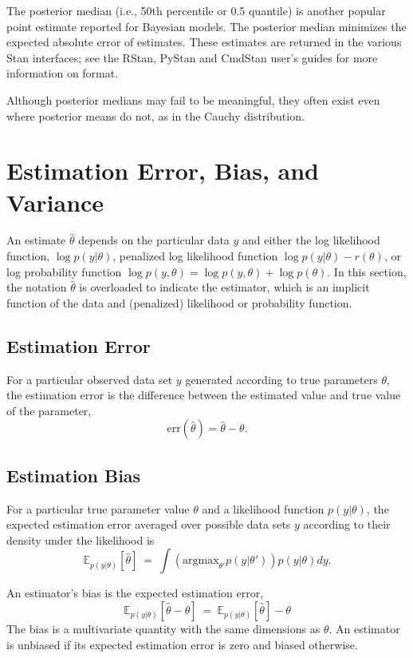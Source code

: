 The posterior median (i.e., 50th percentile or 0.5 quantile) is
another popular point estimate reported for Bayesian models.  The
posterior median minimizes the expected absolute error of estimates.
These estimates are returned in the various Stan interfaces;  see the
RStan, PyStan and CmdStan user's guides for more information on
format. 

Although posterior medians may fail to be meaningful, they often exist
even where posterior means do not, as in the Cauchy distribution.



\section{Estimation Error, Bias, and Variance}\label{estimation-bias.section}

An estimate $\hat{\theta}$ depends on the particular data $y$ and
either the log likelihood function, $\log p(y|\theta)$, penalized log
likelihood function $\log p(y|\theta) - r(\theta)$, or log probability
function $\log p(y,\theta) = \log p(y,\theta) + \log p(\theta)$.  In
this section, the notation $\hat{\theta}$ is overloaded to indicate
the estimator, which is an implicit function of the data and
(penalized) likelihood or probability function.

\subsection{Estimation Error}

For a particular observed data set $y$ generated according to true
parameters $\theta$, the estimation error is the difference between
the estimated value and true value of the parameter,
\[
\mbox{err}(\hat{\theta}) = \hat{\theta} - \theta.
\]
%

\subsection{Estimation Bias}

For a particular true parameter value $\theta$ and a likelihood
function $p(y|\theta)$, the expected estimation error averaged over
possible data sets $y$ according to their density under the likelihood
is
%
\[
\mathbb{E}_{p(y|\theta)}[\hat{\theta}] 
\ = \
\int \left( \mbox{argmax}_{\theta'} p(y|\theta') \right) p(y|\theta) dy.
\]

An estimator's bias is the expected estimation error,
%
\[
\mathbb{E}_{p(y|\theta)}[\hat{\theta} - \theta]
\ = \
\mathbb{E}_{p(y|\theta)}[\hat{\theta}] - \theta
\]
%
The bias is a multivariate quantity with the same dimensions as
$\theta$.  An estimator is unbiased if its expected estimation error
is zero and biased otherwise.

